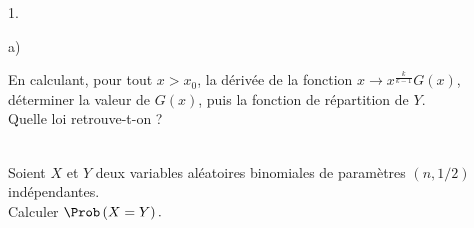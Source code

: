 \documentclass[11pt]{article}%
\begin{document}
\begin{exerciceAP}
\begin{noliste}{1.}
\begin{noliste}{a)}
    \item En calculant, pour tout $x>x_{0}$, la dérivée de la fonction $%
      x\rightarrow x^{\frac{k}{k-1}}G\left( x\right) $, déterminer la valeur
      de $G\left( x\right) $, puis la fonction de répartition de $Y$.\\
      Quelle loi retrouve-t-on ?
    \end{noliste}
  \end{noliste}



\end{exerciceAP}


\begin{exerciceSP}~\\
  Soient $X$ et $Y$ deux variables aléatoires binomiales de paramètres
  $\left( n,1/2\right) $ indépendantes.\\
  Calculer $\Prob\left( X=Y\right) .$
\end{exerciceSP}

\newpage
\end{document}
